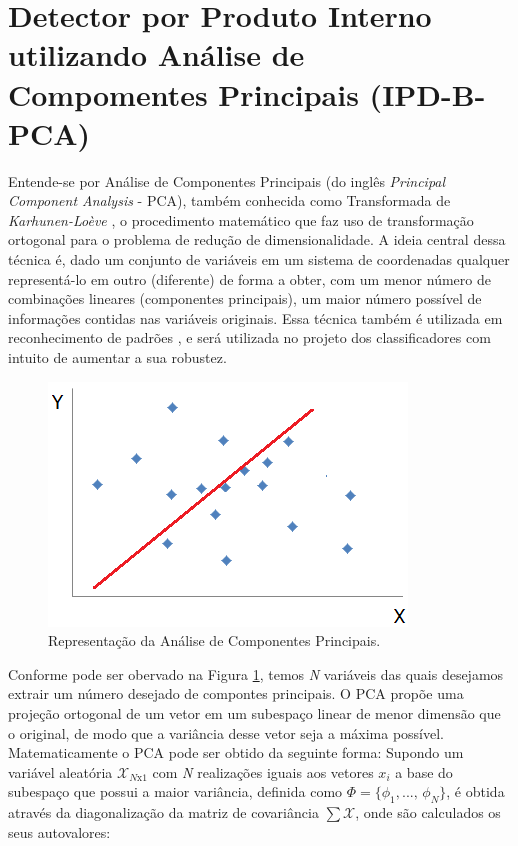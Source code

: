 \section{Detector por Produto Interno utilizando Análise de Compomentes Principais (IPD-B-PCA)}

Entende-se por Análise de Componentes Principais (do inglês \textit{Principal Component Analysis} - PCA), também conhecida como  Transformada de \textit{Karhunen-Loève} \cite{schurmann1996pattern}, o procedimento matemático que faz uso de transformação ortogonal para o problema de redução de dimensionalidade. A ideia central dessa técnica é, dado um conjunto de  variáveis em um sistema de coordenadas qualquer representá-lo em outro (diferente) de forma a obter, com um menor número de combinações lineares (componentes principais), um maior número possível de informações contidas nas variáveis originais. Essa técnica também é utilizada em reconhecimento de padrões \cite{waldir2010facial}, e será utilizada no projeto dos classificadores com intuito de aumentar a sua robustez.

\begin{figure}[!htb]
\centering
\includegraphics[scale=1]{figuras/pca.PNG}
\caption{Representação da Análise de Componentes Principais.}
\label{fig_pca}
\end{figure}

Conforme pode ser obervado na Figura \ref{fig_pca}, temos \textit{N} variáveis das quais desejamos extrair um número desejado de compontes principais. O PCA propõe uma projeção ortogonal de um vetor em um subespaço linear de menor dimensão que o original, de modo que a variância desse vetor seja a máxima possível. Matematicamente o PCA pode ser obtido da seguinte forma: Supondo um variável aleatória $\mathcal{X}_{N\text{x}1}$ com \textit{N} realizações iguais aos vetores $x_i$ a base do subespaço que possui a maior variância, definida como $\Phi  = \{ {\phi _1},...,\,{\phi _N}\}$, é obtida através da diagonalização da matriz de covariância $\sum\mathcal{X}$, onde são calculados os seus autovalores:

